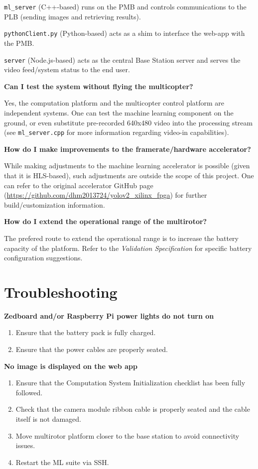 \documentclass[10pt,letterpaper]{article}
\begin{document}
\texttt{ml\_server} (C++-based) runs on the PMB and controls communications to the PLB (sending images and retrieving results).

\texttt{pythonClient.py} (Python-based) acts as a shim to interface the web-app with the PMB.

\texttt{server} (Node.js-based) acts as the central Base Station server and serves the video feed/system status to the end user.

\textbf{Can I test the system without flying the multicopter?}

Yes, the computation platform and the multicopter control platform are independent systems. One can test the machine learning component on the ground, or even substitute pre-recorded 640x480 video into the processing stream (see \texttt{ml\_server.cpp} for more information regarding video-in capabilities).

\textbf{How do I make improvements to the framerate/hardware accelerator?}

While making adjustments to the machine learning accelerator is possible (given that it is HLS-based), such adjustments are outside the scope of this project. One can refer to the original accelerator GitHub page (\url{https://github.com/dhm2013724/yolov2_xilinx_fpga}) for further build/customization information.

\textbf{How do I extend the operational range of the multirotor?}

The prefered route to extend the operational range is to increase the battery capacity of the platform. Refer to the \textit{Validation Specification} for specific battery configuration suggestions.

\section{Troubleshooting}
\textbf{Zedboard and/or Raspberry Pi power lights do not turn on}
\begin{enumerate}
\item Ensure that the battery pack is fully charged.
\item Ensure that the power cables are properly seated.
\end{enumerate}

\textbf{No image is displayed on the web app}
\begin{enumerate}
\item Ensure that the Computation System Initialization checklist has been fully followed.
\item Check that the camera module ribbon cable is properly seated and the cable itself is not damaged.
\item Move multirotor platform closer to the base station to avoid connectivity issues.
\item Restart the ML suite via SSH.
\end{enumerate}
\end{document}
